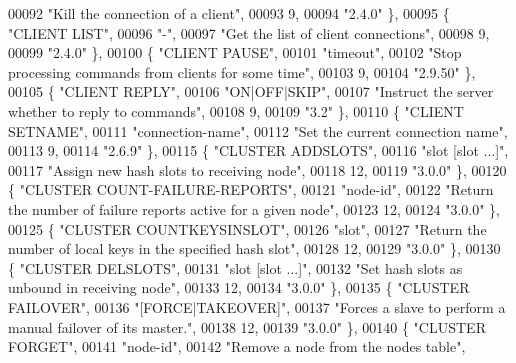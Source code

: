 \begin{DoxyCode}
00092     \textcolor{stringliteral}{"Kill the connection of a client"},
00093     9,
00094     \textcolor{stringliteral}{"2.4.0"} \},
00095     \{ \textcolor{stringliteral}{"CLIENT LIST"},
00096     \textcolor{stringliteral}{"-"},
00097     \textcolor{stringliteral}{"Get the list of client connections"},
00098     9,
00099     \textcolor{stringliteral}{"2.4.0"} \},
00100     \{ \textcolor{stringliteral}{"CLIENT PAUSE"},
00101     \textcolor{stringliteral}{"timeout"},
00102     \textcolor{stringliteral}{"Stop processing commands from clients for some time"},
00103     9,
00104     \textcolor{stringliteral}{"2.9.50"} \},
00105     \{ \textcolor{stringliteral}{"CLIENT REPLY"},
00106     \textcolor{stringliteral}{"ON|OFF|SKIP"},
00107     \textcolor{stringliteral}{"Instruct the server whether to reply to commands"},
00108     9,
00109     \textcolor{stringliteral}{"3.2"} \},
00110     \{ \textcolor{stringliteral}{"CLIENT SETNAME"},
00111     \textcolor{stringliteral}{"connection-name"},
00112     \textcolor{stringliteral}{"Set the current connection name"},
00113     9,
00114     \textcolor{stringliteral}{"2.6.9"} \},
00115     \{ \textcolor{stringliteral}{"CLUSTER ADDSLOTS"},
00116     \textcolor{stringliteral}{"slot [slot ...]"},
00117     \textcolor{stringliteral}{"Assign new hash slots to receiving node"},
00118     12,
00119     \textcolor{stringliteral}{"3.0.0"} \},
00120     \{ \textcolor{stringliteral}{"CLUSTER COUNT-FAILURE-REPORTS"},
00121     \textcolor{stringliteral}{"node-id"},
00122     \textcolor{stringliteral}{"Return the number of failure reports active for a given node"},
00123     12,
00124     \textcolor{stringliteral}{"3.0.0"} \},
00125     \{ \textcolor{stringliteral}{"CLUSTER COUNTKEYSINSLOT"},
00126     \textcolor{stringliteral}{"slot"},
00127     \textcolor{stringliteral}{"Return the number of local keys in the specified hash slot"},
00128     12,
00129     \textcolor{stringliteral}{"3.0.0"} \},
00130     \{ \textcolor{stringliteral}{"CLUSTER DELSLOTS"},
00131     \textcolor{stringliteral}{"slot [slot ...]"},
00132     \textcolor{stringliteral}{"Set hash slots as unbound in receiving node"},
00133     12,
00134     \textcolor{stringliteral}{"3.0.0"} \},
00135     \{ \textcolor{stringliteral}{"CLUSTER FAILOVER"},
00136     \textcolor{stringliteral}{"[FORCE|TAKEOVER]"},
00137     \textcolor{stringliteral}{"Forces a slave to perform a manual failover of its master."},
00138     12,
00139     \textcolor{stringliteral}{"3.0.0"} \},
00140     \{ \textcolor{stringliteral}{"CLUSTER FORGET"},
00141     \textcolor{stringliteral}{"node-id"},
00142     \textcolor{stringliteral}{"Remove a node from the nodes table"},

\end{DoxyCode}
